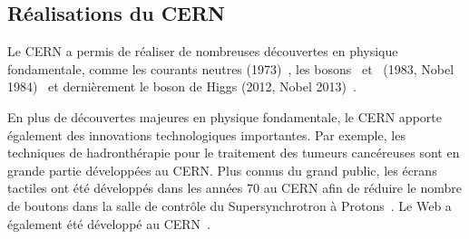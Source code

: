\subsection{Réalisations du CERN}
Le CERN a permis de réaliser de nombreuses découvertes en physique fondamentale, comme
les courants neutres (1973)~\cite{Hasert:243640,HASERT1973138,Hasert:203096},
les bosons \Wboson\ et \Zboson\ (1983, Nobel 1984)~\cite{Wboson_discovery1,Wboson_discovery2,Wboson_discovery3,Zboson_discovery1,Zboson_discovery2}
et dernièrement le boson de Higgs (2012, Nobel 2013)~\cite{ATLAS_Higgs_discovery,CMS_Higgs_discovery}.
\par En plus de découvertes majeures en physique fondamentale, le CERN apporte également des innovations technologiques importantes.
Par exemple, les techniques de hadronthérapie pour le traitement des tumeurs cancéreuses sont en grande partie développées au CERN.
Plus connus du grand public, les écrans tactiles ont été développés dans les années 70 au CERN afin de réduire le nombre de boutons dans la salle de contrôle du Supersynchrotron à Protons~\cite{CERN_touchscreen}.
Le Web a également été développé au CERN~\cite{CERN_web}.
